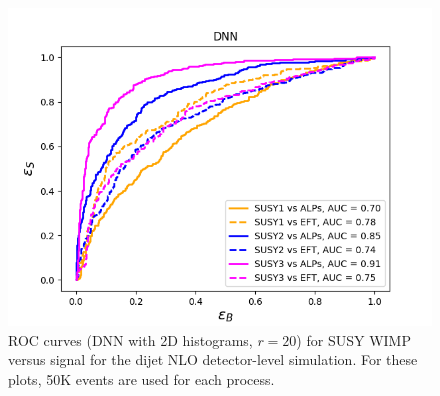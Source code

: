 \documentclass[prd,aps,letterpaper,floatfix,superscriptaddress,preprintnumbers,twocolumn,10pt,nofootinbib]{revtex4-1}
\begin{document}
\begin{figure}%
\centering
\includegraphics[scale=0.50]{figures/2D_DNN_SUSY_vs_sig_NLO_pt-metphij1_ROC.png}
\caption{ROC curves (DNN with 2D histograms, $r = 20$) for SUSY WIMP versus signal for the dijet NLO detector-level simulation. For these plots, 50K events are used for each process.}\label{2D_DNN_SUSY_vs_sig_NLO_ROC}
\end{figure}
\end{document}
